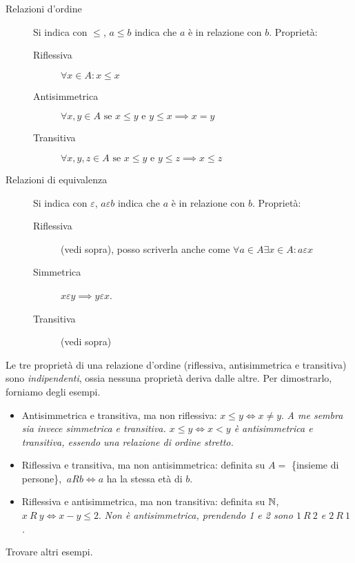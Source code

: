 \begin{description}
    \item[Relazioni d'ordine] Si indica con $\le$, $a \leq b$ indica che $a$ \`e in relazione con $b$. Propriet\`a:
    \begin{description}
        \item [Riflessiva] $\forall x \in A : x \leq x$
        \item [Antisimmetrica] $\forall x, y \in A \text{ se } x \leq y \text{ e }  y \leq x \implies x = y$
        \item [Transitiva] $\forall x, y, z \in A \text{ se } x \leq y \text{ e } y \leq z \implies x \leq z$
    \end{description}
    \item[Relazioni di equivalenza] Si indica con $\varepsilon$, $a \varepsilon b$ indica che $a$ \`e in relazione con $b$. Propriet\`a:
    \begin{description}
      \item [Riflessiva] (vedi sopra), posso scriverla anche come $\forall a \in A \exists x \in A : a \varepsilon x$
      \item [Simmetrica] $x \varepsilon y \implies y \varepsilon x$.
      \item [Transitiva] (vedi sopra)
    \end{description}
\end{description}

Le tre propriet\`a di una relazione d'ordine (riflessiva, antisimmetrica e transitiva) sono \textit{indipendenti}, ossia nessuna propriet\`a deriva dalle altre. Per dimostrarlo, forniamo degli esempi.
\begin{itemize}
  \item Antisimmetrica e transitiva, ma non riflessiva: $x \le y \iff x \neq y$. \textit{A me sembra sia invece simmetrica e transitiva. $x \le y \iff x < y$ \`e antisimmetrica e transitiva, essendo una relazione di ordine stretto.}
  \item Riflessiva e transitiva, ma non antisimmetrica: definita su $A = $ \{insieme di persone\}, $ \ a R b \iff a$ ha la stessa et\`a di $b$.
  \item Riflessiva e antisimmetrica, ma non transitiva: definita su $\mathbb{N}$, $x \ R \ y \iff x - y \le 2$. \textit{Non \`e antisimmetrica, prendendo 1 e 2 sono $1 \ R \ 2$ e $2 \ R \ 1$.}
\end{itemize}

\begin{esercizio}
Trovare altri esempi.
\end{esercizio}

